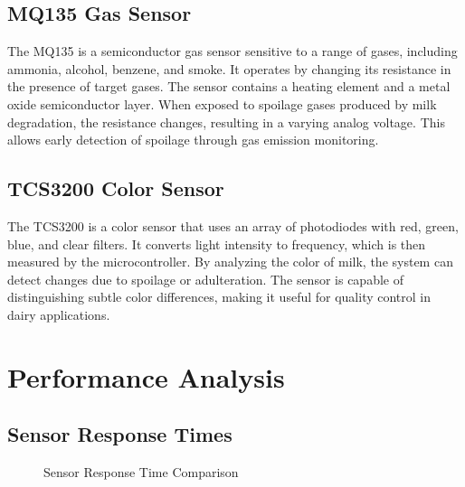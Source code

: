 \documentclass[12pt,a4paper]{article}
\begin{document}
\subsection{MQ135 Gas Sensor}
The MQ135 is a semiconductor gas sensor sensitive to a range of gases, including ammonia, alcohol, benzene, and smoke. It operates by changing its resistance in the presence of target gases. The sensor contains a heating element and a metal oxide semiconductor layer. When exposed to spoilage gases produced by milk degradation, the resistance changes, resulting in a varying analog voltage. This allows early detection of spoilage through gas emission monitoring.

\subsection{TCS3200 Color Sensor}
The TCS3200 is a color sensor that uses an array of photodiodes with red, green, blue, and clear filters. It converts light intensity to frequency, which is then measured by the microcontroller. By analyzing the color of milk, the system can detect changes due to spoilage or adulteration. The sensor is capable of distinguishing subtle color differences, making it useful for quality control in dairy applications.

\section{Performance Analysis}

\subsection{Sensor Response Times}
\begin{figure}[H]
\centering
{}
\caption{Sensor Response Time Comparison}
\label{fig:response_time}
\end{figure}
\end{document}
